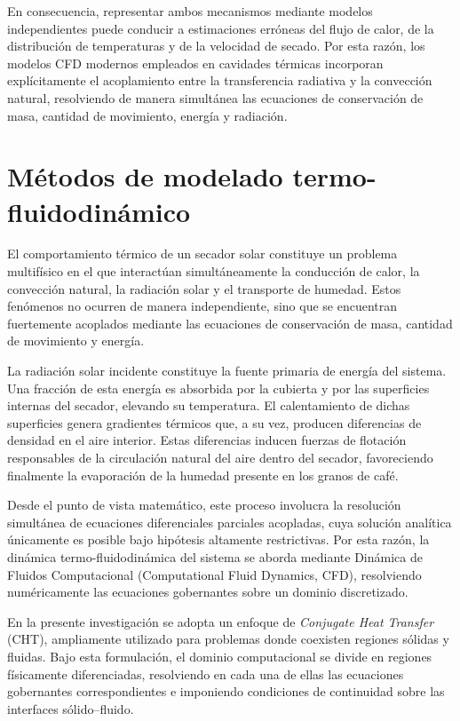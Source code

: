 En consecuencia, representar ambos mecanismos mediante modelos independientes puede conducir a estimaciones erróneas del flujo de calor, de la distribución de temperaturas y de la velocidad de secado. Por esta razón, los modelos CFD modernos empleados en cavidades térmicas incorporan explícitamente el acoplamiento entre la transferencia radiativa y la convección natural, resolviendo de manera simultánea las ecuaciones de conservación de masa, cantidad de movimiento, energía y radiación.


\section{Métodos de modelado termo-fluidodinámico}

El comportamiento térmico de un secador solar constituye un problema multifísico en el que interactúan simultáneamente la conducción de calor, la convección natural, la radiación solar y el transporte de humedad. Estos fenómenos no ocurren de manera independiente, sino que se encuentran fuertemente acoplados mediante las ecuaciones de conservación de masa, cantidad de movimiento y energía.

La radiación solar incidente constituye la fuente primaria de energía del sistema. Una fracción de esta energía es absorbida por la cubierta y por las superficies internas del secador, elevando su temperatura. El calentamiento de dichas superficies genera gradientes térmicos que, a su vez, producen diferencias de densidad en el aire interior. Estas diferencias inducen fuerzas de flotación responsables de la circulación natural del aire dentro del secador, favoreciendo finalmente la evaporación de la humedad presente en los granos de café.

Desde el punto de vista matemático, este proceso involucra la resolución simultánea de ecuaciones diferenciales parciales acopladas, cuya solución analítica únicamente es posible bajo hipótesis altamente restrictivas. Por esta razón, la dinámica termo-fluidodinámica del sistema se aborda mediante Dinámica de Fluidos Computacional (Computational Fluid Dynamics, CFD), resolviendo numéricamente las ecuaciones gobernantes sobre un dominio discretizado.

En la presente investigación se adopta un enfoque de \textit{Conjugate Heat Transfer} (CHT), ampliamente utilizado para problemas donde coexisten regiones sólidas y fluidas. Bajo esta formulación, el dominio computacional se divide en regiones físicamente diferenciadas, resolviendo en cada una de ellas las ecuaciones gobernantes correspondientes e imponiendo condiciones de continuidad sobre las interfaces sólido--fluido.

